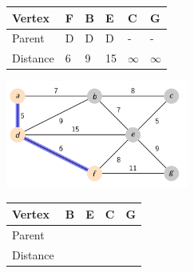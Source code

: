 \documentclass{beamer}
\begin{document}
\begin{frame}[fragile]
    \centering
    \begin{table}[]
        \begin{tabular}{|l|l|l|l|l|l|}
            \hline
            Vertex   & F & B & E  & C        & G        \\ \hline
            Parent   & D & D & D  & -        & -        \\ \hline
            Distance & 6 & 9 & 15 & $\infty$ & $\infty$ \\ \hline
        \end{tabular}
    \end{table}
    \includegraphics[width=0.45\textwidth]{./imgs/dijkstra_walkthrough/dijkstra-3.png}
    \begin{table}[]
        \begin{tabular}{|l|l|l|l|l|}
            \hline
            Vertex   & B & E  & C  & G  \\ \hline
            Parent   &  &   &   &   \\ \hline
            Distance &  &   &   &  \\ \hline
        \end{tabular}
    \end{table}
\end{frame}
\end{document}
